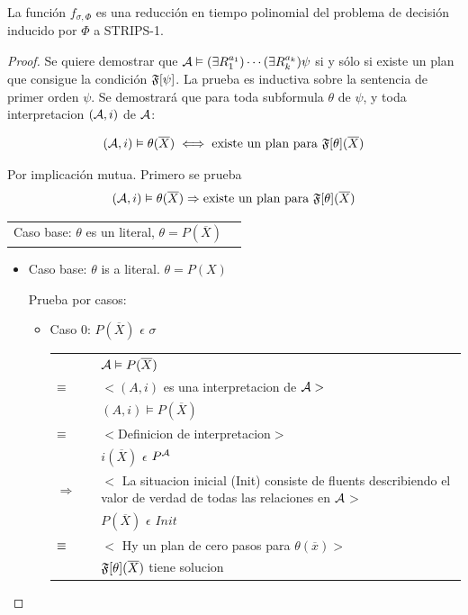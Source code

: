 \begin{theorem}
La función $f_{\sigma, \Phi}$ es una reducción en tiempo polinomial del
problema de decisión inducido por $\Phi$ a STRIPS-1.
\end{theorem}

\begin{proof}
Se quiere demostrar que
$\mathcal{A}\vDash(\exists R_1^{a_1})\cdots(\exists R_k^{a_k})\psi$ si y sólo si
existe un plan que consigue la condición $\mathfrak{F}[\psi]$. La prueba es inductiva
sobre la sentencia de primer orden $\psi$. Se demostrará que para toda subformula 
$\theta$ de $\psi$, y toda interpretacion $(\mathcal{A},i)$ de $\mathcal{A}$:

\[ (\mathcal{A},i) \vDash \theta(\overline{X}) \iff \text{existe un plan para } \mathfrak{F}[\theta](\overline{X}) \]

Por implicación mutua. Primero se prueba
\[ (\mathcal{A},i) \vDash \theta(\overline{X}) \Rightarrow \text{existe un plan para } \mathfrak{F}[\theta](\overline{X}) \]

\begin{tabular}{ll}
\multirow{2}{*}{Caso base: $\theta$ es un literal, $\theta = P(\overline{X})$}\\
\multirow{2}{*}{Caso $P(\overline{X})$ $\in$ $\sigma$}
\end{tabular}

\begin{itemize}
		\item Caso base: $\theta$ is a literal. $\theta = P(X)$ 
		
		Prueba por casos:
			\begin{itemize}
				\item Caso 0: $P(\overline{X})$ $\epsilon$ $\sigma$
				
				\begin{tabular}{@{}p{1mm}p{1mm}p{11cm}}	
						& & $\mathcal{A} \vDash P(\overline{X})$\\
						$\equiv$ & & $<(A,i)$ es una interpretacion de $\mathcal{A}>$ \\
						& & $(A,i) \models P(\overline{X})$ \\
						$\equiv$ & & $<$Definicion de interpretacion$>$\\
						& & $i(\overline{X})$ $\epsilon$ $P^{\mathcal{A}}$\\
						$\Rightarrow$ & & $<$ La situacion inicial (Init) consiste de fluents describiendo el valor de 
									  verdad de todas las relaciones en $\mathcal{A}$$>$\\
						& & $P(\overline{X})$ $\epsilon$ $Init$ \\
						$\equiv$ & & $<$ Hy un plan de cero pasos para $\theta(\overline{x})>$\\
						& & $\mathfrak{F}[\theta](\overline{X})$ tiene solucion
					\end{tabular}
					

\end{itemize}
\end{itemize}
\end{proof}
